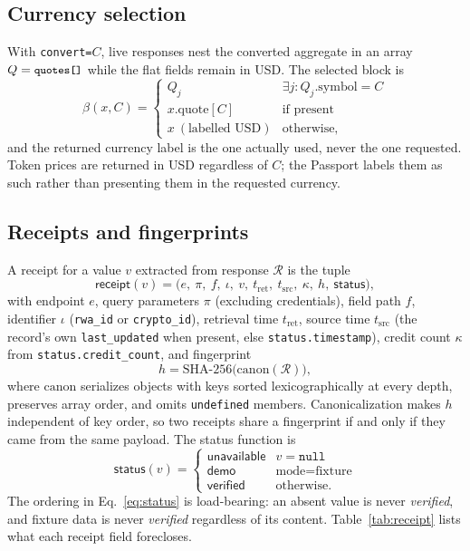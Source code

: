\documentclass[11pt]{article}
\newcommand{\code}[1]{\texttt{\small #1}}
\begin{document}
\subsection{Currency selection}
With \code{convert=}\(C\), live responses nest the converted aggregate in an array \(Q=\code{quotes[]}\) while the flat fields remain in USD. The selected block is
\begin{equation}
\beta(x,C)=\begin{cases}
Q_j & \exists j: Q_j.\mathrm{symbol}=C\\
x.\mathrm{quote}[C] & \text{if present}\\
x \ (\text{labelled USD}) & \text{otherwise,}
\end{cases}
\end{equation}
and the returned currency label is the one actually used, never the one requested. Token prices are returned in USD regardless of \(C\); the Passport labels them as such rather than presenting them in the requested currency.

\subsection{Receipts and fingerprints}
A receipt for a value \(v\) extracted from response \(\mathcal{R}\) is the tuple
\begin{equation}
\mathsf{receipt}(v)=\big(e,\ \pi,\ f,\ \iota,\ v,\ t_{\mathrm{ret}},\ t_{\mathrm{src}},\ \kappa,\ h,\ \mathsf{status}\big),
\end{equation}
with endpoint \(e\), query parameters \(\pi\) (excluding credentials), field path \(f\), identifier \(\iota\) (\code{rwa\_id} or \code{crypto\_id}), retrieval time \(t_{\mathrm{ret}}\), source time \(t_{\mathrm{src}}\) (the record's own \code{last\_updated} when present, else \code{status.timestamp}), credit count \(\kappa\) from \code{status.credit\_count}, and fingerprint
\begin{equation}
h=\mathrm{SHA\mbox{-}256}\big(\mathrm{canon}(\mathcal{R})\big),
\end{equation}
where \(\mathrm{canon}\) serializes objects with keys sorted lexicographically at every depth, preserves array order, and omits \code{undefined} members. Canonicalization makes \(h\) independent of key order, so two receipts share a fingerprint if and only if they came from the same payload. The status function is
\begin{equation}
\mathsf{status}(v)=\begin{cases}
\textsf{unavailable} & v=\mathtt{null}\\
\textsf{demo} & \text{mode}=\text{fixture}\\
\textsf{verified} & \text{otherwise.}
\end{cases}
\label{eq:status}
\end{equation}
The ordering in Eq.~\ref{eq:status} is load-bearing: an absent value is never \emph{verified}, and fixture data is never \emph{verified} regardless of its content. Table~\ref{tab:receipt} lists what each receipt field forecloses.
\end{document}
